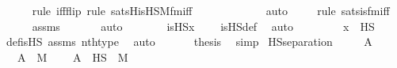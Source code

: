 \begin{isabellebody}
\ \ \ \ \ \isamarkupfalse%
{\isacharparenleft}{\kern0pt}rule\ iff{\isacharunderscore}{\kern0pt}flip{\isacharcomma}{\kern0pt}\ rule\ sats{\isacharunderscore}{\kern0pt}His{\isacharunderscore}{\kern0pt}HS{\isacharunderscore}{\kern0pt}M{\isacharunderscore}{\kern0pt}fm{\isacharunderscore}{\kern0pt}iff{\isacharparenright}{\kern0pt}\isanewline
\ \ \ \ \ \ \ \ \ \ \ \isamarkupfalse%
\ auto{\isacharbrackleft}{\kern0pt}{}{\isacharbrackright}{\kern0pt}\isanewline
\ \ \ \ \isamarkupfalse%
{\isacharparenleft}{\kern0pt}rule\ sats{\isacharunderscore}{\kern0pt}is{\isacharunderscore}{\kern0pt}{}{\isacharunderscore}{\kern0pt}fm{\isacharunderscore}{\kern0pt}iff{\isacharparenright}{\kern0pt}\isanewline
\ \ \ \ \isamarkupfalse%
\ assms\ \isanewline
\ \ \ \ \isamarkupfalse%
\ auto\isanewline
\ \ \isamarkupfalse%
\ \isamarkupfalse%
\ {\isachardoublequoteopen}{\isachardot}{\kern0pt}{\isachardot}{\kern0pt}{\isachardot}{\kern0pt}\ {\isasymlongleftrightarrow}\ is{\isacharunderscore}{\kern0pt}HS{\isacharparenleft}{\kern0pt}x{\isacharparenright}{\kern0pt}\ {\isacharequal}{\kern0pt}\ {}{\isachardoublequoteclose}\ \isamarkupfalse%
\ is{\isacharunderscore}{\kern0pt}HS{\isacharunderscore}{\kern0pt}def\ \isamarkupfalse%
\ auto\ \isanewline
\ \ \isamarkupfalse%
\ \isamarkupfalse%
\ {\isachardoublequoteopen}{\isachardot}{\kern0pt}{\isachardot}{\kern0pt}{\isachardot}{\kern0pt}\ {\isasymlongleftrightarrow}\ x\ {\isasymin}\ HS{\isachardoublequoteclose}\ \isamarkupfalse%
\ def{\isacharunderscore}{\kern0pt}is{\isacharunderscore}{\kern0pt}HS\ assms\ nth{\isacharunderscore}{\kern0pt}type\ \isamarkupfalse%
\ auto\ \isanewline
\ \ \isamarkupfalse%
\ \isamarkupfalse%
\ {\isacharquery}{\kern0pt}thesis\ \isamarkupfalse%
\ simp\isanewline
{}\isamarkupfalse%
%
\endisatagproof
{\isafoldproof}%
%
\isadelimproof
\isanewline
%
\endisadelimproof
\isanewline
{}\isamarkupfalse%
\ HS{\isacharunderscore}{\kern0pt}separation\ {\isacharcolon}{\kern0pt}\ \isanewline
\ \ \ A\ \isanewline
\ \ \ {\isachardoublequoteopen}A\ {\isasymin}\ M{\isachardoublequoteclose}\ \isanewline
\ \ \ {\isachardoublequoteopen}A\ {\isasyminter}\ HS\ {\isasymin}\ M{\isachardoublequoteclose}\ \isanewline
%
\isadelimproof
%
\endisadelimproof
%
\isatagproof

\end{isabellebody}
